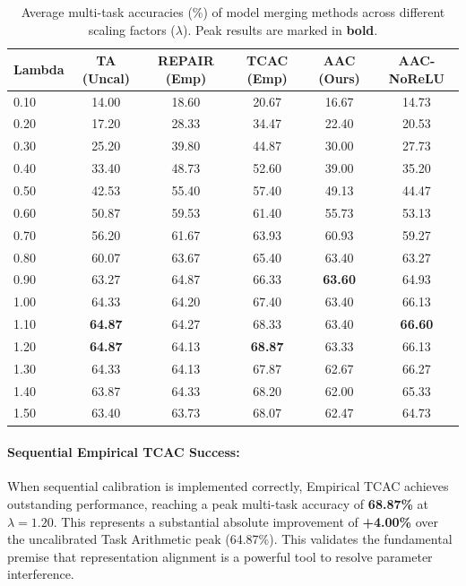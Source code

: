 \documentclass{article}
\theoremstyle{plain}
\theoremstyle{definition}
\theoremstyle{remark}
\begin{document}
\begin{table}[t]
\caption{Average multi-task accuracies (\%) of model merging methods across different scaling factors ($\lambda$). Peak results are marked in \textbf{bold}.}
\label{tab:results}
\centering
\begin{tabular}{lccccc}
\toprule
\textbf{Lambda} & \textbf{TA (Uncal)} & \textbf{REPAIR (Emp)} & \textbf{TCAC (Emp)} & \textbf{AAC (Ours)} & \textbf{AAC-NoReLU} \\
\midrule
0.10 & 14.00 & 18.60 & 20.67 & 16.67 & 14.73 \\
0.20 & 17.20 & 28.33 & 34.47 & 22.40 & 20.53 \\
0.30 & 25.20 & 39.80 & 44.87 & 30.00 & 27.73 \\
0.40 & 33.40 & 48.73 & 52.60 & 39.00 & 35.20 \\
0.50 & 42.53 & 55.40 & 57.40 & 49.13 & 44.47 \\
0.60 & 50.87 & 59.53 & 61.40 & 55.73 & 53.13 \\
0.70 & 56.20 & 61.67 & 63.93 & 60.93 & 59.27 \\
0.80 & 60.07 & 63.67 & 65.40 & 63.40 & 63.27 \\
0.90 & 63.27 & 64.87 & 66.33 & \textbf{63.60} & 64.93 \\
1.00 & 64.33 & 64.20 & 67.40 & 63.40 & 66.13 \\
1.10 & \textbf{64.87} & 64.27 & 68.33 & 63.40 & \textbf{66.60} \\
1.20 & \textbf{64.87} & 64.13 & \textbf{68.87} & 63.33 & 66.13 \\
1.30 & 64.33 & 64.13 & 67.87 & 62.67 & 66.27 \\
1.40 & 63.87 & 64.33 & 68.20 & 62.00 & 65.33 \\
1.50 & 63.40 & 63.73 & 68.07 & 62.47 & 64.73 \\
\bottomrule
\end{tabular}
\end{table}

\paragraph{Sequential Empirical TCAC Success:}
When sequential calibration is implemented correctly, Empirical TCAC achieves outstanding performance, reaching a peak multi-task accuracy of \textbf{68.87\%} at $\lambda = 1.20$. This represents a substantial absolute improvement of \textbf{+4.00\%} over the uncalibrated Task Arithmetic peak (64.87\%). This validates the fundamental premise that representation alignment is a powerful tool to resolve parameter interference.
\end{document}
